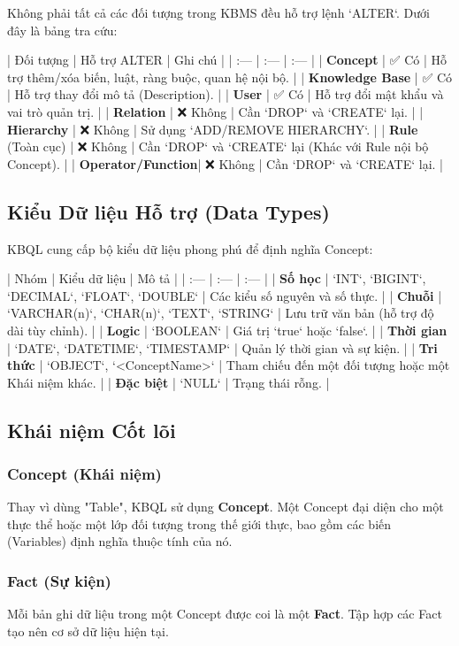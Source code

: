 Không phải tất cả các đối tượng trong KBMS đều hỗ trợ lệnh `ALTER`. Dưới đây là bảng tra cứu:

| Đối tượng | Hỗ trợ ALTER | Ghi chú |
| :--- | :--- | :--- |
| \textbf{Concept} | ✅ Có | Hỗ trợ thêm/xóa biến, luật, ràng buộc, quan hệ nội bộ. |
| \textbf{Knowledge Base} | ✅ Có | Hỗ trợ thay đổi mô tả (Description). |
| \textbf{User} | ✅ Có | Hỗ trợ đổi mật khẩu và vai trò quản trị. |
| \textbf{Relation} | ❌ Không | Cần `DROP` và `CREATE` lại. |
| \textbf{Hierarchy} | ❌ Không | Sử dụng `ADD/REMOVE HIERARCHY`. |
| \textbf{Rule} (Toàn cục) | ❌ Không | Cần `DROP` và `CREATE` lại (Khác với Rule nội bộ Concept). |
| \textbf{Operator/Function}| ❌ Không | Cần `DROP` và `CREATE` lại. |

\subsection{Kiểu Dữ liệu Hỗ trợ (Data Types)}

KBQL cung cấp bộ kiểu dữ liệu phong phú để định nghĩa Concept:

| Nhóm | Kiểu dữ liệu | Mô tả |
| :--- | :--- | :--- |
| \textbf{Số học} | `INT`, `BIGINT`, `DECIMAL`, `FLOAT`, `DOUBLE` | Các kiểu số nguyên và số thực. |
| \textbf{Chuỗi} | `VARCHAR(n)`, `CHAR(n)`, `TEXT`, `STRING` | Lưu trữ văn bản (hỗ trợ độ dài tùy chỉnh). |
| \textbf{Logic} | `BOOLEAN` | Giá trị `true` hoặc `false`. |
| \textbf{Thời gian} | `DATE`, `DATETIME`, `TIMESTAMP` | Quản lý thời gian và sự kiện. |
| \textbf{Tri thức} | `OBJECT`, `<ConceptName>` | Tham chiếu đến một đối tượng hoặc một Khái niệm khác. |
| \textbf{Đặc biệt} | `NULL` | Trạng thái rỗng. |

\subsection{Khái niệm Cốt lõi}

\subsubsection{Concept (Khái niệm)}
Thay vì dùng "Table", KBQL sử dụng \textbf{Concept}. Một Concept đại diện cho một thực thể hoặc một lớp đối tượng trong thế giới thực, bao gồm các biến (Variables) định nghĩa thuộc tính của nó.

\subsubsection{Fact (Sự kiện)}
Mỗi bản ghi dữ liệu trong một Concept được coi là một \textbf{Fact}. Tập hợp các Fact tạo nên cơ sở dữ liệu hiện tại.

